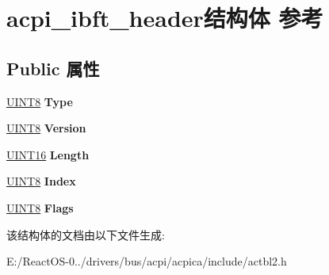 \hypertarget{structacpi__ibft__header}{}\section{acpi\+\_\+ibft\+\_\+header结构体 参考}
\label{structacpi__ibft__header}
\subsection*{Public 属性}
\begin{DoxyCompactItemize}
\item 
\mbox{\label{structacpi__ibft__header_acd1bbcdd1df6ec788b9a8c8412cbb00c}} 
\hyperlink{_processor_bind_8h_ab27e9918b538ce9d8ca692479b375b6a}{U\+I\+N\+T8} {\bfseries Type}
\item 
\mbox{\label{structacpi__ibft__header_a9d800eb4fe76b80ad0e73b2ba6e9e13d}} 
\hyperlink{_processor_bind_8h_ab27e9918b538ce9d8ca692479b375b6a}{U\+I\+N\+T8} {\bfseries Version}
\item 
\mbox{\label{structacpi__ibft__header_ab69ac54f40f8aa42dec63dd9638c479e}} 
\hyperlink{_processor_bind_8h_a09f1a1fb2293e33483cc8d44aefb1eb1}{U\+I\+N\+T16} {\bfseries Length}
\item 
\mbox{\label{structacpi__ibft__header_a5d355fce9fe776294c7fa5065f9ed43b}} 
\hyperlink{_processor_bind_8h_ab27e9918b538ce9d8ca692479b375b6a}{U\+I\+N\+T8} {\bfseries Index}
\item 
\mbox{\label{structacpi__ibft__header_a4d8d462e19e8f677e79b1c13441afb7b}} 
\hyperlink{_processor_bind_8h_ab27e9918b538ce9d8ca692479b375b6a}{U\+I\+N\+T8} {\bfseries Flags}
\end{DoxyCompactItemize}


该结构体的文档由以下文件生成\+:\begin{DoxyCompactItemize}
\item 
E\+:/\+React\+O\+S-\/0../drivers/bus/acpi/acpica/include/actbl2.\+h\end{DoxyCompactItemize}
